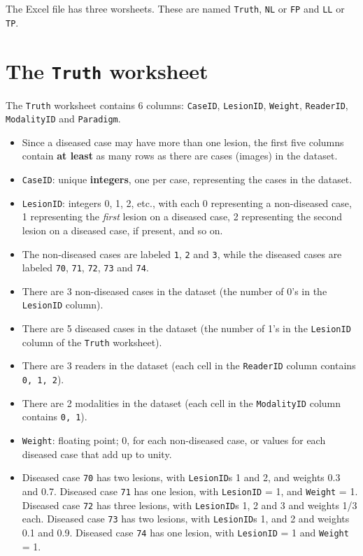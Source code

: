 \documentclass[
]{book}
\providecommand{\tightlist}{%
  \setlength{\itemsep}{0pt}\setlength{\parskip}{0pt}}
\begin{document}
The Excel file has three worsheets. These are named \texttt{Truth}, \texttt{NL} or \texttt{FP} and \texttt{LL} or \texttt{TP}.

\hypertarget{the-truth-worksheet-1}{%
\section{\texorpdfstring{The \texttt{Truth} worksheet}{The Truth worksheet}}\label{the-truth-worksheet-1}}

The \texttt{Truth} worksheet contains 6 columns: \texttt{CaseID}, \texttt{LesionID}, \texttt{Weight}, \texttt{ReaderID}, \texttt{ModalityID} and \texttt{Paradigm}.

\begin{itemize}
\tightlist
\item
  Since a diseased case may have more than one lesion, the first five columns contain \textbf{at least} as many rows as there are cases (images) in the dataset.
\item
  \texttt{CaseID}: unique \textbf{integers}, one per case, representing the cases in the dataset.
\item
  \texttt{LesionID}: integers 0, 1, 2, etc., with each 0 representing a non-diseased case, 1 representing the \emph{first} lesion on a diseased case, 2 representing the second lesion on a diseased case, if present, and so on.
\item
  The non-diseased cases are labeled \texttt{1}, \texttt{2} and \texttt{3}, while the diseased cases are labeled \texttt{70}, \texttt{71}, \texttt{72}, \texttt{73} and \texttt{74}.
\item
  There are 3 non-diseased cases in the dataset (the number of 0's in the \texttt{LesionID} column).
\item
  There are 5 diseased cases in the dataset (the number of 1's in the \texttt{LesionID} column of the \texttt{Truth} worksheet).
\item
  There are 3 readers in the dataset (each cell in the \texttt{ReaderID} column contains \texttt{0,\ 1,\ 2}).
\item
  There are 2 modalities in the dataset (each cell in the \texttt{ModalityID} column contains \texttt{0,\ 1}).
\item
  \texttt{Weight}: floating point; 0, for each non-diseased case, or values for each diseased case that add up to unity.\\
\item
  Diseased case \texttt{70} has two lesions, with \texttt{LesionID}s 1 and 2, and weights 0.3 and 0.7. Diseased case \texttt{71} has one lesion, with \texttt{LesionID} = 1, and \texttt{Weight} = 1. Diseased case \texttt{72} has three lesions, with \texttt{LesionID}s 1, 2 and 3 and weights 1/3 each. Diseased case \texttt{73} has two lesions, with \texttt{LesionID}s 1, and 2 and weights 0.1 and 0.9. Diseased case \texttt{74} has one lesion, with \texttt{LesionID} = 1 and \texttt{Weight} = 1.

\end{itemize}
\end{document}
